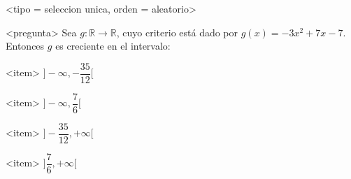 <tipo = seleccion unica, orden = aleatorio>

<pregunta>
Sea $g:\mathbb R \to \mathbb R$, cuyo criterio est\'a dado por $g(x) = -3x^2 +7x -7$. Entonces $g$ es creciente en el intervalo:


<item>
$\bigg]{-}\infty, -\dfrac{35}{12}\bigg[$

<item>
$\bigg]{-}\infty, \dfrac{7}{6}\bigg[$

<item>
$\bigg]-\dfrac{35}{12}, +\infty\bigg[$

<item>
$\bigg]\dfrac{7}{6}, +\infty\bigg[$



